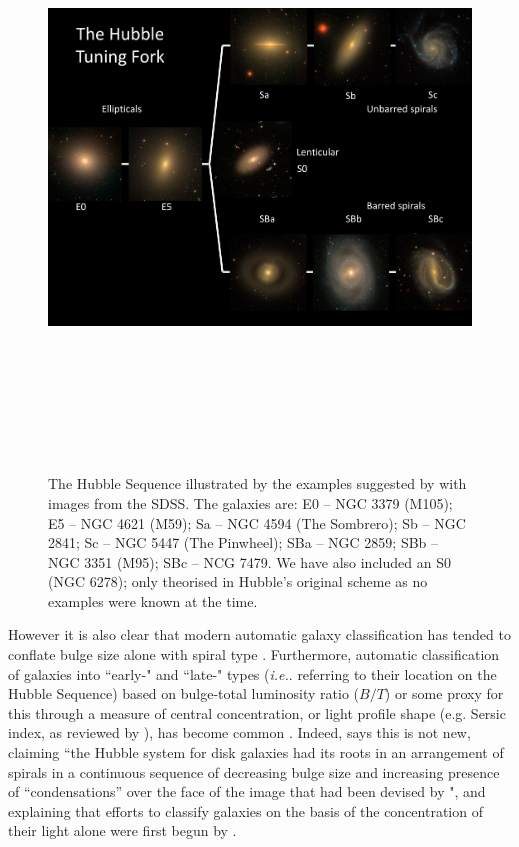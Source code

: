 \documentclass[usenatbib]{mn2e}
\newcommand{\ie}{{\it i.e.}}
\begin{document}
\begin{landscape}
\begin{figure}
\includegraphics[height=160mm]{TuningFork_HubbleExamples.png}
\caption{The Hubble Sequence illustrated by the examples suggested by \citet{Hubble1926} with images from the SDSS. The galaxies are: E0 -- NGC 3379 (M105); E5 -- NGC 4621 (M59);  Sa -- NGC 4594 (The Sombrero);  Sb -- NGC 2841; Sc -- NGC 5447 (The Pinwheel); SBa -- NGC 2859; SBb -- NGC 3351 (M95); SBc -- NCG 7479. We have also included an S0 (NGC 6278); only theorised in Hubble's original scheme as no examples were known at the time. \label{sequence}}
\end{figure}
\end{landscape}

However it is also clear that modern automatic galaxy classification has tended to conflate bulge size alone with spiral type \citep[e.g.][]{Goto2003, Laurikainen2007, gadotti2009, Masters2010}. Furthermore, automatic classification of galaxies into ``early-" and ``late-" types (\ie. referring to their location on the Hubble Sequence) based on bulge-total luminosity ratio ($B/T$) or some proxy for this through a measure of central concentration, or light profile shape (e.g. Sersic index, as reviewed by \citealt{2005PASA...22..118G}), has become common \citep[e.g.]{vanderWel2011}. Indeed, \citep{Sandage2005} says this is not new, claiming ``the Hubble system for disk galaxies had its roots in an arrangement of spirals in a continuous sequence of decreasing bulge size and increasing presence of ``condensations'' over the face of the image that had been devised by \citet{Reynolds1920}", and explaining that efforts to classify galaxies on the basis of the concentration of their light alone were first begun by \citet{Shapley1927}. 
\end{document}
